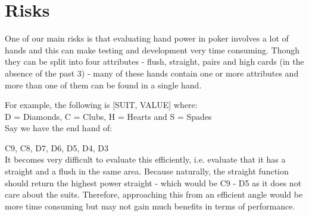 \documentclass[11pt]{article}
\begin{document}
\section*{Risks}
One of our main risks is that evaluating hand power in poker involves a lot of hands and this can make testing and development very time consuming. Though they can be split into four attributes - flush, straight, pairs and high cards (in the absence of the past 3) - many of these hands contain one or more attributes and more than one of them can be found in a single hand.

For example, the following is [SUIT, VALUE] where: \\
D = Diamonds, C = Clubs, H = Hearts and S = Spades \\

Say we have the end hand of:



C9, C8, D7, D6, D5, D4, D3 \\


It becomes very difficult to evaluate this efficiently, i.e. evaluate that it has a straight and a flush in the same area. Because naturally, the straight function should return the highest power straight - which would be C9 - D5 as it does not care about the suits. Therefore, approaching this from an efficient angle would be more time consuming but may not gain much benefits in terms of performance. 
\end{document}
